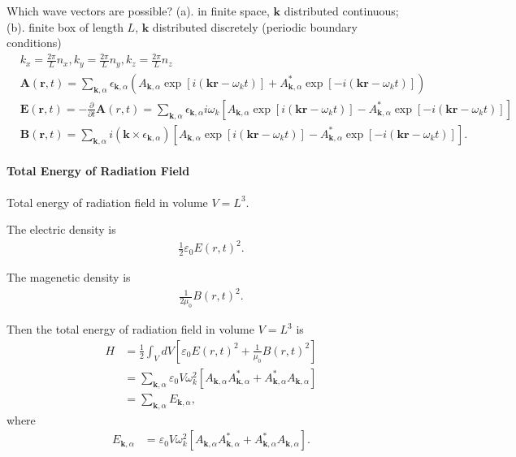 \documentclass[../../note.tex]{subfiles}
\begin{document}
Which wave vectors are possible? (a). in finite space, $\textbf{k}$ distributed continuous; (b). finite box of length $L$, $\textbf{k}$ distributed discretely (periodic boundary conditions)
\begin{align}
    &k_x = \frac{2 \pi}{L} n_x, k_y = \frac{2\pi}{L} n_y, k_z = \frac{2 \pi}{L} n_z \\
    &\textbf{A}(\textbf{r},t) 
    = \sum_{\textbf{k}, \alpha} \epsilon_{\textbf{k}, \alpha} \left(A_{\textbf{k},\alpha} \exp[i(\textbf{kr} - \omega_k t)] + A_{\textbf{k},\alpha}^\ast \exp[- i(\textbf{kr} - \omega_k t)]\right) \\
    &\textbf{E}(\textbf{r},t) = -\frac{\partial}{\partial t} \textbf{A}(r,t) = \sum_{\textbf{k},\alpha} \epsilon_{\textbf{k},\alpha}i \omega_{k} \left[A_{\textbf{k},\alpha} \exp[i(\textbf{kr}-\omega_k t)] - A_{\textbf{k},\alpha}^\ast \exp[-i(\textbf{kr}-\omega_k t)] \right]\\
    &\textbf{B}(\textbf{r},t) = \sum_{\textbf{k},\alpha} i (\textbf{k} \times \epsilon_{\textbf{k},\alpha}) \left[A_{\textbf{k},\alpha} \exp[i(\textbf{kr}-\omega_k t)] - A_{\textbf{k},\alpha}^\ast \exp[-i(\textbf{kr}-\omega_k t)] \right].
\end{align}

\paragraph{Total Energy of Radiation Field}
Total energy of radiation field in volume $V = L^3$.

The electric density is
\begin{align}
    \frac{1}{2} \varepsilon_0 E(r,t)^2.
\end{align}

The magenetic density is
\begin{align}
    \frac{1}{2 \mu_0} B(r,t)^2. 
\end{align}

Then the total energy of radiation field in volume $V = L^3$ is
\begin{align}
    H 
    &= \frac{1}{2} \int_V dV \left[\varepsilon_0 E(r,t)^2 + \frac{1}{\mu_0} B(r,t)^2\right] \\
    &= \sum_{\textbf{k},\alpha} \varepsilon_0 V \omega_{k}^2 \left[A_{\textbf{k},\alpha} A_{\textbf{k},\alpha}^\ast + A_{\textbf{k},\alpha}^\ast A_{\textbf{k},\alpha}\right] \\
    &= \sum_{\textbf{k},\alpha} E_{\textbf{k},\alpha},
\end{align}
where 
\begin{align}
    E_{\textbf{k},\alpha}
    &=  \varepsilon_0 V \omega_{k}^2 \left[A_{\textbf{k},\alpha} A_{\textbf{k},\alpha}^\ast + A_{\textbf{k},\alpha}^\ast A_{\textbf{k},\alpha}\right].
\end{align}
\end{document}
